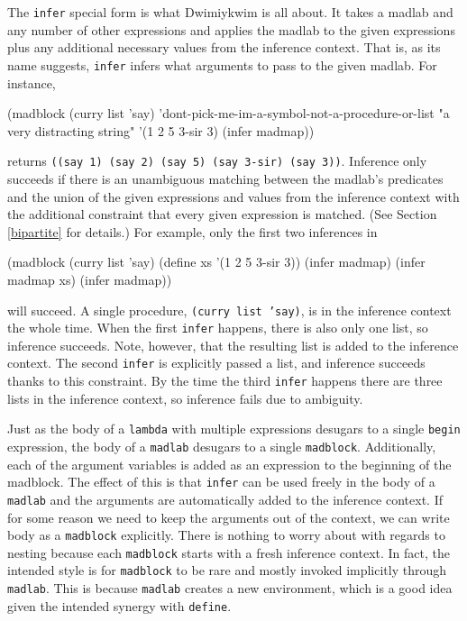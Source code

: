 \documentclass[11pt]{article}
\begin{document}
The \texttt{infer} special form is what Dwimiykwim is all about.
It takes a madlab and any number of other expressions
and applies the madlab to the given expressions
plus any additional necessary values from the inference context.
That is, as its name suggests,
\texttt{infer} infers what arguments to pass to the given madlab.
For instance,
\begin{verbbox}
(madblock
 (curry list 'say)
 'dont-pick-me-im-a-symbol-not-a-procedure-or-list
 "a very distracting string"
 '(1 2 5 3-sir 3)
 (infer madmap))
\end{verbbox}
\begin{center}\theverbbox\end{center}
returns \texttt{((say 1) (say 2) (say 5) (say 3-sir) (say 3))}.
Inference only succeeds if there is an unambiguous matching
between the madlab's predicates and the union of the given expressions
and values from the inference context
with the additional constraint that every given expression is matched.
(See Section \ref{bipartite} for details.)
For example, only the first two inferences in
\begin{verbbox}
(madblock
 (curry list 'say)
 (define xs '(1 2 5 3-sir 3))
 (infer madmap)
 (infer madmap xs)
 (infer madmap))
\end{verbbox}
\begin{center}\theverbbox\end{center}
will succeed.
A single procedure, \texttt{(curry list 'say)},
is in the inference context the whole time.
When the first \texttt{infer} happens,
there is also only one list, so inference succeeds.
Note, however, that the resulting list is added to the inference context.
The second \texttt{infer} is explicitly passed a list,
and inference succeeds thanks to this constraint.
By the time the third \texttt{infer} happens
there are three lists in the inference context,
so inference fails due to ambiguity.

Just as the body of a \texttt{lambda} with multiple expressions
desugars to a single \texttt{begin} expression,
the body of a \texttt{madlab} desugars to a single \texttt{madblock}.
Additionally, each of the argument variables is added as an expression
to the beginning of the madblock.
The effect of this is that \texttt{infer} can be used freely
in the body of a \texttt{madlab}
and the arguments are automatically added to the inference context.
If for some reason we need to keep the arguments out of the context,
we can write body as a \texttt{madblock} explicitly.
There is nothing to worry about with regards to nesting
because each \texttt{madblock} starts with a fresh inference context.
In fact, the intended style is for \texttt{madblock} to be rare
and mostly invoked implicitly through \texttt{madlab}.
This is because \texttt{madlab} creates a new environment,
which is a good idea given the intended synergy with \texttt{define}.
\end{document}
